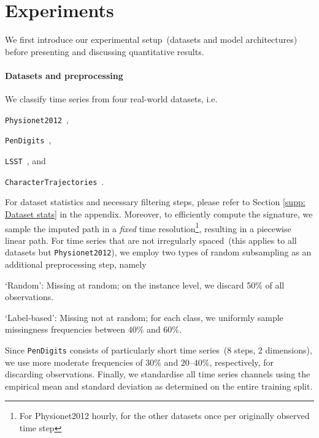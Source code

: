 \documentclass{article}
\begin{document}


\section{Experiments}

We first introduce our experimental setup~(datasets and model
architectures) before presenting and discussing quantitative results.

\paragraph{Datasets and preprocessing}

We classify time series from four real-world datasets, i.e.\
%
\begin{inparaenum}[(i)]
  \item \texttt{Physionet2012}~\citep{goldberger2000physiobank},
  \item \texttt{PenDigits}~\citep{Dua2019},
  \item \texttt{LSST}~\citep{allam2018photometric}, and
  \item \texttt{CharacterTrajectories}~\citep{Dua2019}.
\end{inparaenum}
%
For dataset statistics and necessary filtering steps, please refer to Section \ref{supp: Dataset stats} in the appendix.
Moreover, to efficiently compute the signature, we
sample the imputed path in a \emph{fixed} time resolution\footnote{For Physionet2012 hourly, for the other datasets once per originally observed time step}, resulting in
a piecewise linear path.
%
For time series that are not irregularly spaced~(this applies to all datasets but \texttt{Physionet2012}), we employ two types of random subsampling as an additional
preprocessing step,
namely
%
\begin{inparaenum}[(1)]
    \item `Random': Missing at random; on the instance level, we discard 50\% of all observations.
    \item `Label-based': Missing not at random; for each
      class, we uniformly sample missingness frequencies between $40\%$
      and $60\%$.
\end{inparaenum}
%
Since \texttt{PenDigits} consists of particularly short time series~(8
steps, 2 dimensions), we use more moderate frequencies of $30\%$
and $20$--$40\%$, respectively, for discarding observations.
Finally, we standardise all time series channels using the empirical mean and standard deviation as determined on the entire training split.
\end{document}
